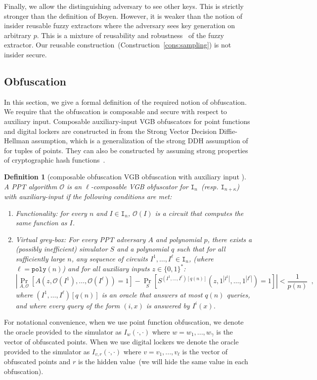 \documentclass[11pt]{article}
\newcommand{\consref}[1]{\mbox{Construction~\ref{#1}}}
\newcommand{\zo}{\ensuremath{\{0, 1\}}}
\newcommand{\poly}{\ensuremath{\mathtt{poly}}\xspace}
\newtheorem{definition}[theorem]{Definition}
\begin{document}
Finally, we allow the distinguishing adversary to see other keys.  This is strictly stronger than the definition of Boyen.  However, it is weaker than the notion of insider reusable fuzzy extractors where the adversary sees key generation on arbitrary $p$.  This is a mixture of reusability and robustness~\cite{dkrs2006} of the fuzzy extractor.  Our reusable construction~(\consref{cons:sampling}) is not insider secure.

\subsection{Obfuscation}
\label{sec:obfuscation def}

In this section, we give a formal definition of the required notion of obfuscation.  
We require that the obfuscation is composable and secure with respect to auxiliary input. Composable auxiliary-input VGB obfuscators for point functions and digital lockers are constructed in \cite[Theorem 6.1]{bitansky2010strong} from the Strong Vector Decision Diffie-Hellman assumption, which is a generalization of the strong DDH assumption of \cite{canetti1997towards} for tuples of points. They can also be constructed by assuming strong properties of cryptographic hash functions~\cite{canetti1997towards}.

\begin{definition}[composable obfuscation VGB obfuscation with auxiliary input \cite{bitansky2010strong}]
\label{def:obf} A PPT algorithm $\mathcal{O}$ is an $\ell$-composable VGB obfuscator for $\mathtt{I}_{n}$~(resp. $\mathtt{I}_{n+\kappa}$) with auxiliary-input if the following conditions are met:
\begin{enumerate}
\item \emph{Functionality:} for every $n$ and $I \in \mathtt{I}_n$, $\mathcal{O}(I)$ is a circuit that computes the same function as $I$.
\item \emph{Virtual grey-box:}  For every PPT adversary $A$ and polynomial $p$, there exists a (possibly inefficient) simulator $S$ and a polynomial $q$ such that for all sufficiently large $n$, any  sequence of circuits $I^1,\dots,I^\ell \in \mathtt{I}_n$, (where $\ell=\poly(n)$) and for all auxiliary inputs $z\in \zo^*$:
\[
|\Pr_{A,\mathcal{O}}[A(z,\mathcal{O}(I^1),\dots,\mathcal{O}(I^\ell)) = 1] - \Pr_{S}[S^{(I^1,\dots,I^\ell)[q(n)]}(z, 1^{|I^1|},\dots,1^{|I^\ell|}) = 1] | < \frac{1}{p(n)} \enspace,
\]
where $(I^1,\dots,I^\ell)[q(n)]$ is an oracle that answers at most $q(n)$ queries, and where every query of the form $(i,x)$ is answered by $I^i(x)$.
\end{enumerate}
\end{definition}
For notational convenience, when we use point function obfuscation, we denote the oracle provided to the simulator as $I_w(\cdot, \cdot)$ where $w = w_1,..., w_\gamma$ is the vector of obfuscated points.  When we use digital lockers we denote the oracle provided to the simulator as $I_{v, r}(\cdot, \cdot)$ where $v = v_1,..., v_\ell$ is the vector of obfuscated points and $r$ is the hidden value~(we will hide the same value in each obfuscation).
\end{document}
